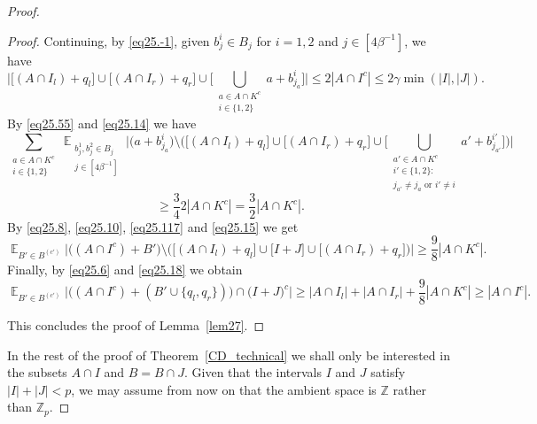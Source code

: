 \documentclass[12pt,reqno]{amsart}
\DeclareMathOperator*{\E}{\mathbb{E}}
\theoremstyle{definition}
\renewcommand\leq{\leqslant}
\renewcommand\geq{\geqslant}
\renewcommand\ge{\geqslant}
\begin{document}
\begin{proof}
\begin{proof}
\vspace{10pt}
Continuing, by \eqref{eq25.-1}, given  $b_j^i\in B_j$ for  $i=1,2$ and $j \in [4\beta^{-1}]$, we have
\begin{equation*}\label{eq25.14}
    \bigg|  \big[(A\cap I_l)+q_l\big]\cup \big[(A\cap I_r)+q_r\big] \cup \big[ \bigcup_{\substack{a \in A\cap K^c \\ i \in \{1,2\} }} a+b_{j_{a}}^{i} \big] \bigg| \leq 2|A \cap I^c| \leq 2\gamma \min(|I|, |J|).
\end{equation*}
By \eqref{eq25.55} and \eqref{eq25.14} we have
\begin{equation}\label{eq25.15}
\sum_{\substack{a \in A\cap K^c \\ i \in \{1,2\}}}\E_{\substack{b_j^1,b_j^2\in B_j \\ j\in[4\beta^{-1}]} }\bigg|\bigg(a+b_{j_a}^i\bigg)\setminus \bigg(\big[(A\cap I_l)+q_l\big]\cup \big[(A\cap I_r)+q_r\big] \cup \big[ \bigcup_{\substack{a' \in A\cap K^c \\ i' \in \{1,2\}: \\ j_{a'}\neq j_a \text{ or } i' \neq i }} a'+b_{j_{a'}}^{i'} \big] \bigg)\bigg|
\end{equation}
\begin{equation*}\label{eq25.17}
\ge \frac{3}{4}2|A\cap K^c| = \frac{3}{2}|A\cap K^c|.
\end{equation*}
By \eqref{eq25.8}, \eqref{eq25.10}, \eqref{eq25.117} and \eqref{eq25.15} we get
\begin{equation}\label{eq25.18}
\E_{B'\in B^{(c')}}\bigg|\bigg((A\cap I^c)+B'\bigg)\setminus \bigg(\big[(A\cap I_l)+q_l\big]\cup \big[I+J\big]\cup \big[(A\cap I_r)+q_r\big]\bigg)\bigg|\geq \frac{9}{8}|A\cap K^c|.
\end{equation}
Finally, by \eqref{eq25.6} and \eqref{eq25.18} we obtain
\begin{equation*}\label{eq25.19}
\E_{B'\in B^{(c')}}\bigg|\bigg((A\cap I^c)+(B'\cup \{q_l,q_r\})\bigg)\cap \bigg(I+J\bigg)^c\bigg|\geq |A\cap I_l|+|A\cap I_r|+\frac{9}{8}|A\cap K^c|\geq |A\cap I^c|.
\end{equation*}

\vspace{5pt}
This concludes the proof of Lemma~\ref{lem27}.
\end{proof}

In the rest of the proof of Theorem~\ref{CD_technical} we shall only be interested in the subsets $A\cap I$ and $B=B\cap J$. Given that the intervals $I$ and $J$ satisfy $|I|+|J|<p$, we may assume from now on that the ambient space is $\mathbb{Z}$ rather than $\mathbb{Z}_p$.



\end{proof}
\end{document}
